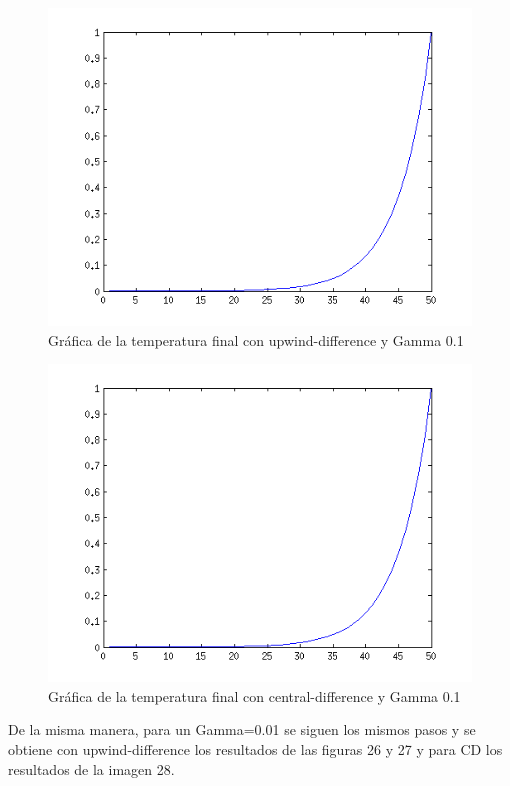 \documentclass[11pt]{article}
\begin{document}
\begin{figure}[tbh]
	\centering
		\includegraphics[width=1.0\textwidth]{imagen24.png}
	\caption{Gr\'afica de la temperatura final con upwind-difference y Gamma 0.1}
	\label{fig:Fig1}
\end{figure}

\begin{figure}[tbh]
	\centering
		\includegraphics[width=1.0\textwidth]{imagen25.png}
	\caption{Gr\'afica de la temperatura final con central-difference y Gamma 0.1}
	\label{fig:Fig1}
\end{figure}

\bigskip De la misma manera, para un Gamma=0.01 se siguen los mismos pasos y se obtiene con upwind-difference los resultados de las figuras 26 y 27 y para CD los resultados de la imagen 28.
\end{document}
